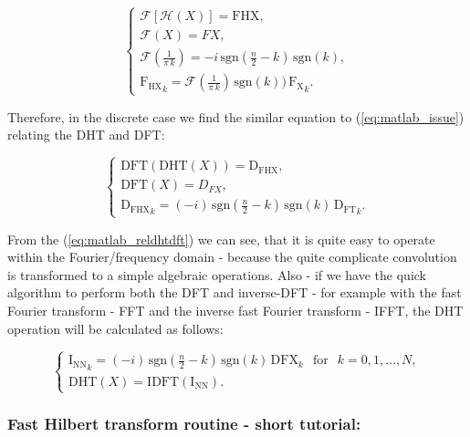 \documentclass[12pt,twoside,a4paper]{article}
\numberwithin{equation}{subsection}
\numberwithin{figure}{subsection}
\begin{document}
\begin{equation} \label{eq:matlab_issue}
	\begin{cases}
	 \mathcal{F} \left[\mathcal{H}(X)\right] = \mathrm{FHX}, \\
	 \mathcal{F} (X) = FX, \\
	 \mathcal{F}(\frac {1}{\pi \, k}) = - i\,\mathrm{sgn}(\frac {n}{2} - k)\,\mathrm{sgn}(k), \\
	 \mathrm{F_{HX}}_k = \mathcal{F}(\frac {1}{\pi \,k}) \, \mathrm{sgn}(k)) \, \mathrm{F_X}_k.
	\end{cases}
\end{equation}

Therefore, in the discrete case we find the similar equation to (\ref{eq:matlab_issue}) relating the DHT and DFT:

\begin{equation} \label{eq:matlab_reldhtdft}
	\begin{cases}
		\mathrm{DFT}(\mathrm{DHT}(X)) = \mathrm{D_{FHX}}, \\
		\mathrm{DFT}(X) = D_{FX}, \\
		\mathrm{D_{FHX}}_k = ( -i) \, \mathrm{sgn}(\frac{n}{2} - k) \, \mathrm{sgn}(k) \, \mathrm{D_{FT}}_k.
	\end{cases}
\end{equation}

From the (\ref{eq:matlab_reldhtdft}) we can see, that it is quite easy to operate within the Fourier/frequency domain - because the quite complicate convolution is transformed to a simple algebraic operations. Also - if we have the quick algorithm to perform both the DFT and inverse-DFT - for example with the fast Fourier transform - FFT and the inverse fast Fourier transform - IFFT, the DHT operation will be calculated as follows:

\begin{equation} \label{eq:matlab_fulldhthdf}
	\begin{cases}
		\mathrm{I_{NN}}_k = (-i) \, \mathrm{sgn}(\frac{n}{2}-k) \, \mathrm{sgn}(k) \, \mathrm{DFX}_k \, \ \mbox{ for } \ \, k=0,1,\ldots, N, \\
		\mathrm{DHT}(X) = \mathrm{IDFT}(\mathrm{I_{NN}}).  
	\end{cases}
\end{equation}

\subsubsection*{Fast Hilbert transform routine - short tutorial:}
\end{document}
